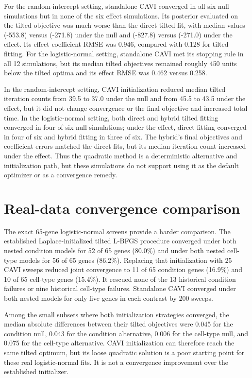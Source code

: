 \documentclass[11pt]{article}
\begin{document}
For the random-intercept setting, standalone CAVI converged in all six null simulations but in none of the six effect simulations. Its posterior evaluated on the tilted objective was much worse than the direct tilted fit, with median values (-553.8) versus (-271.8) under the null and (-827.8) versus (-271.0) under the effect. Its effect coefficient RMSE was 0.946, compared with 0.128 for tilted fitting. For the logistic-normal setting, standalone CAVI met its stopping rule in all 12 simulations, but its median tilted objectives remained roughly 450 units below the tilted optima and its effect RMSE was 0.462 versus 0.258.

In the random-intercept setting, CAVI initialization reduced median tilted iteration counts from 39.5 to 37.0 under the null and from 45.5 to 43.5 under the effect, but it did not change convergence or the final objective and increased total time. In the logistic-normal setting, both direct and hybrid tilted fitting converged in four of six null simulations; under the effect, direct fitting converged in four of six and hybrid fitting in three of six. The hybrid's final objectives and coefficient errors matched the direct fits, but its median iteration count increased under the effect. Thus the quadratic method is a deterministic alternative and initialization path, but these simulations do not support using it as the default optimizer or as a convergence remedy.

\section{Real-data convergence comparison}

The exact 65-gene logistic-normal screens provide a harder comparison. The established Laplace-initialized tilted L-BFGS procedure converged under both nested condition models for 52 of 65 genes (80.0\%) and under both nested cell-type models for 56 of 65 genes (86.2\%). Replacing that initialization with 25 CAVI sweeps reduced joint convergence to 11 of 65 condition genes (16.9\%) and 10 of 65 cell-type genes (15.4\%). It rescued none of the 13 historical condition failures or nine historical cell-type failures. Standalone CAVI converged under both nested models for only five genes in each contrast by 200 sweeps.

Among the small subsets where both initialization strategies converged, the median absolute differences between their tilted objectives were 0.045 for the condition null, 0.043 for the condition alternative, 0.006 for the cell-type null, and 0.075 for the cell-type alternative. CAVI initialization can therefore reach the same tilted optimum, but its loose quadratic solution is a poor starting point for these real logistic-normal fits. It is not a convergence improvement over the established initializer.
\end{document}
